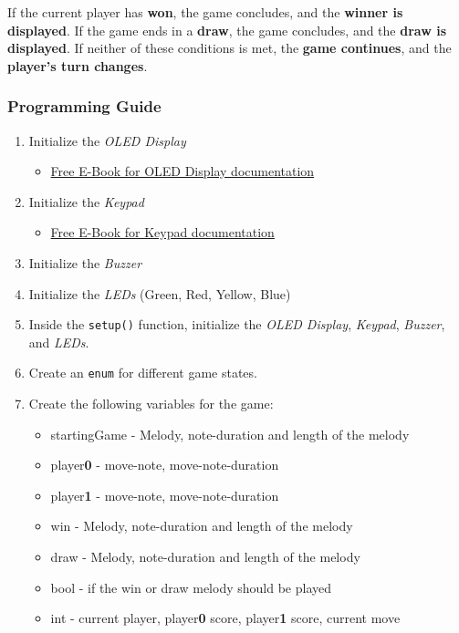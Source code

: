 \documentclass[10pt, oneside]{article}
\theoremstyle{remark}
\begin{document}
\noindent If the current player has \textbf{won}, the game concludes, and the \textbf{winner is displayed}. If the game ends in a \textbf{draw}, the game concludes, and the \textbf{draw is displayed}. If neither of these conditions is met, the \textbf{game continues}, and the \textbf{player’s turn changes}.

\subsubsection{Programming Guide}
\begin{enumerate}
  \item Initialize the \textit{OLED Display}
  \begin{itemize}
    \item \href{https://www.az-delivery.de/en/collections/kostenlose-e-books}{Free E-Book for OLED Display documentation}
  \end{itemize}
  \item Initialize the \textit{Keypad}
  \begin{itemize}
    \item \href{https://www.az-delivery.de/en/collections/kostenlose-e-books}{Free E-Book for Keypad documentation}
  \end{itemize}
  \item Initialize the \textit{Buzzer}
  \item Initialize the \textit{LEDs} (Green, Red, Yellow, Blue)
  \item Inside the \texttt{setup()} function, initialize the \textit{OLED Display}, \textit{Keypad}, \textit{Buzzer}, and \textit{LEDs}.
  \item Create an \texttt{enum} for different game states.
  \item Create the following variables for the game:
  \begin{itemize}
    \item startingGame - Melody, note-duration and length of the melody
    \item player\textbf{0} - move-note, move-note-duration
    \item player\textbf{1} - move-note, move-note-duration
    \item win - Melody, note-duration and length of the melody
    \item draw - Melody, note-duration and length of the melody
    \item bool - if the win or draw melody should be played
    \item int - current player, player\textbf{0} score, player\textbf{1} score, current move

\end{itemize}
\end{enumerate}
\end{document}
